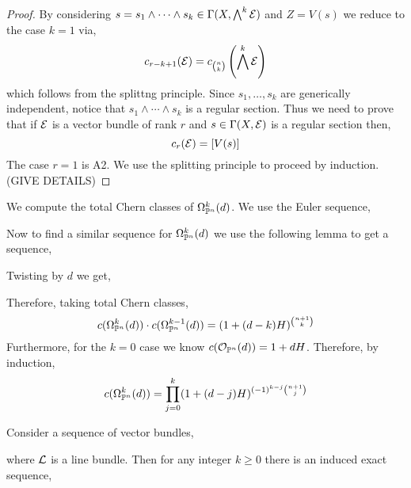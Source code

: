\documentclass[12pt]{article}
\begin{document}
\begin{proof}
By considering $s = s_1 \wedge \cdots \wedge s_k \in \Gamma(X, \bigwedge^k \E)$ and $Z = V(s)$ we reduce to the case $k = 1$ via,
\[ c_{r-k+1}(\E) = c_{{n \choose k}} \left(\bigwedge^k \E\right) \]
which follows from the splittng principle. Since $s_1, \dots, s_k$ are generically independent, notice that $s_1 \wedge \cdots \wedge s_k$ is a regular section. Thus we need to prove that if $\E$ is a vector bundle of rank $r$ and $s \in \Gamma(X, \E)$ is a regular section then,
\[ c_r(\E) = [V(s)] \]
The case $r = 1$ is A2. We use the splitting principle to proceed by induction. (GIVE DETAILS)
\end{proof}

\begin{example}
We compute the total Chern classes of $\Omega^k_{\P^n}(d)$. We use the Euler sequence,
\begin{center}
\end{center}
Now to find a similar sequence for $\Omega^k_{\P^n}(d)$ we use the following lemma to get a sequence,
\begin{center}
\end{center}
Twisting by $d$ we get,
\begin{center}
\end{center}
Therefore, taking total Chern classes,
\[ c(\Omega^k_{\P^n}(d)) \cdot c(\Omega^{k-1}_{\P^n}(d)) = (1 + (d - k) H)^{{n + 1 \choose k }} \] 
Furthermore, for the $k = 0$ case we know $c(\struct{\P^n}(d)) = 1 + d H$. Therefore, by induction,
\[ c(\Omega^k_{\P^n}(d)) = \prod_{j = 0}^k (1 + (d - j) H)^{(-1)^{k-j} { n + 1 \choose j }} \]
\end{example}

\begin{lemma}
Consider a sequence of vector bundles,
\begin{center}
\end{center}
where $\L$ is a line bundle. Then for any integer $k \ge 0$ there is an induced exact sequence,
\begin{center}
\end{center}
\end{lemma}
\end{document}
